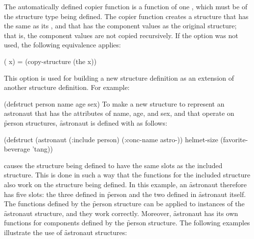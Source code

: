The automatically defined copier function is a function of
one ,
which must be of the structure type being defined.
The copier function creates a  
structure that has the same  as its ,
and that has the  component values as the original 
structure; that is, the component values are not copied recursively.
If the   option was not used,
the following equivalence applies:

\code
 ( x) = (copy-structure (the  x))
\endcode
{}


This option is used for building a new structure definition as
an extension of another structure definition.  For example:

\code
 (defstruct person name age sex)
\endcode
To make a new structure to represent an astronaut
that has the
attributes of name, age, and sex, and 
that operate on \f{person} structures, \f{astronaut} is defined
with  as follows:

\code
 (defstruct (astronaut (:include person)
                       (:conc-name astro-))
    helmet-size
    (favorite-beverage 'tang))
\endcode

 causes the structure being defined
to have the same slots as the included structure.
This is done in such a way
that the  functions for the included
structure also work on the structure being defined.
In this example, an
\f{astronaut} therefore has five slots: the three defined in
\f{person} and the two defined in \f{astronaut}
itself.  The  functions defined by the \f{person} structure
can be applied to instances of the \f{astronaut} structure, and they
work correctly.
Moreover, \f{astronaut} has its own  functions for
components defined by the \f{person} structure.
The following examples illustrate the 
use of \f{astronaut} structures:

